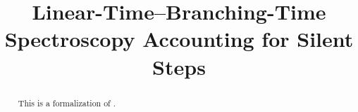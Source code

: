 \documentclass[11pt,a4paper]{article}
\begin{document}
\title{Linear-Time--Branching-Time Spectroscopy Accounting for Silent Steps}
\author{}
\maketitle

\begin{abstract}
    This is a formalization of \cite{bisping2023lineartimebranchingtime}.
\end{abstract}

\tableofcontents

%













\appendix








\end{document}
